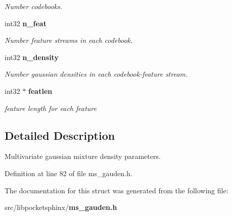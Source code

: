 \begin{DoxyCompactItemize}
\begin{DoxyCompactList}\small\item\em Number codebooks. \end{DoxyCompactList}\item 
int32 {\bf n\-\_\-feat}\label{structgauden__t_a6dea221962b4a278dbae4806925a7be0}

\begin{DoxyCompactList}\small\item\em Number feature streams in each codebook. \end{DoxyCompactList}\item 
int32 {\bf n\-\_\-density}\label{structgauden__t_ab5104d8fa59bc94b12b36104dd4c19ac}

\begin{DoxyCompactList}\small\item\em Number gaussian densities in each codebook-\/feature stream. \end{DoxyCompactList}\item 
int32 $\ast$ {\bf featlen}\label{structgauden__t_aca099d830de926e628ac0b523046b32c}

\begin{DoxyCompactList}\small\item\em feature length for each feature \end{DoxyCompactList}\end{DoxyCompactItemize}


\subsection{Detailed Description}
Multivariate gaussian mixture density parameters. 

Definition at line 82 of file ms\-\_\-gauden.\-h.



The documentation for this struct was generated from the following file\-:\begin{DoxyCompactItemize}
\item 
src/libpocketsphinx/{\bf ms\-\_\-gauden.\-h}\end{DoxyCompactItemize}
